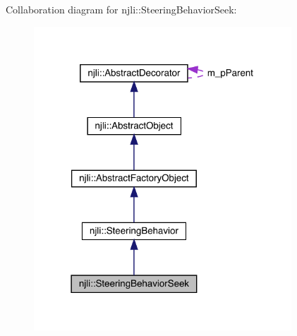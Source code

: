 Collaboration diagram for njli\+:\+:Steering\+Behavior\+Seek\+:\nopagebreak
\begin{figure}[H]
\begin{center}
\leavevmode
\includegraphics[width=274pt]{classnjli_1_1_steering_behavior_seek__coll__graph}
\end{center}
\end{figure}

